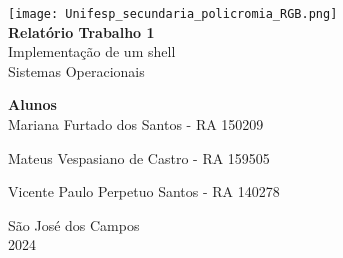 \documentclass[12pt, letterpaper]{article}
\begin{document}
\begin{titlepage}
    \begin{center}
        \Large
        \vspace*{1cm}

        \texttt{[image: Unifesp\_secundaria\_policromia\_RGB.png]} \\   \vspace*{5cm}
        \Huge
        \textbf{Relatório Trabalho 1} \\\vspace*{1cm}
        \huge
        Implementação de um shell \vspace*{0.25cm}\\
        
       Sistemas Operacionais

        \vspace{4cm}
        \Large
        
    \end{center}
    
    \begin{flushright}
        \Large
        \textbf{Alunos}\\
        \large
            Mariana Furtado dos Santos - RA 150209

            
            Mateus Vespasiano de Castro - RA 159505

            
            Vicente Paulo Perpetuo Santos - RA 140278
    \end{flushright}
    
    \vspace*{\fill}
    \centering \large São José dos Campos\\ 2024
    
\end{titlepage}


\renewcommand{\contentsname}{Sumário}
\renewcommand{\cfttoctitlefont}{\hfill\Large\bfseries} 
\renewcommand{\cftaftertoctitle}{\hfill} 
\renewcommand{\cftsecfont}{\normalfont} 
\renewcommand{\cftsecpagefont}{\normalfont} 
\end{document}
